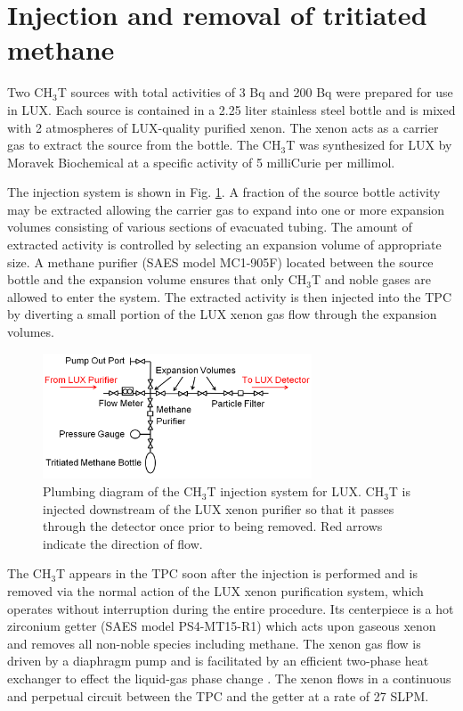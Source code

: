 \section{Injection and removal of tritiated methane}

Two CH$_3$T sources with total activities of 3 Bq and 200 Bq were prepared for use in LUX. Each source is contained in a 2.25 liter stainless steel bottle and is mixed with 2 atmospheres of LUX-quality purified xenon. The xenon acts as a carrier gas to extract the source from the bottle. The CH$_3$T was synthesized for LUX by Moravek Biochemical \cite{moravek} at a specific activity of 5 milliCurie per millimol.

The injection system is shown in Fig. \ref{fig:plumbing}. A fraction of the source bottle activity may be extracted allowing the carrier gas to expand into one or more expansion volumes consisting of various sections of evacuated tubing. The amount of extracted activity is controlled by selecting an expansion volume of appropriate size. A methane purifier (SAES model MC1-905F) located between the source bottle and the expansion volume ensures that only CH$_3$T and noble gases are allowed to enter the system. The extracted activity is then injected into the TPC by diverting a small portion of the LUX xenon gas flow through the expansion volumes. 

\begin{figure}[H]\centering
\includegraphics[width=80mm]{fig/TritiumPlumbing.png}
\caption{Plumbing diagram of the CH$_3$T injection system for LUX. CH$_3$T is injected downstream of the LUX xenon purifier so that it passes through the detector once prior to being removed.  Red arrows indicate the direction of flow.}
\label{fig:plumbing}
\end{figure}

The CH$_3$T appears in the TPC soon after the injection is performed and is removed via the normal action of the LUX xenon purification system, which operates without interruption during the entire procedure. Its centerpiece is a hot zirconium getter (SAES model PS4-MT15-R1) which acts upon gaseous xenon and removes all non-noble species including methane. The xenon gas flow is driven by a diaphragm pump and is facilitated by an efficient two-phase heat exchanger to effect the liquid-gas phase change \cite{two phase_hx}. The xenon flows in a continuous and perpetual circuit between the TPC and the getter at a rate of 27 SLPM. 

